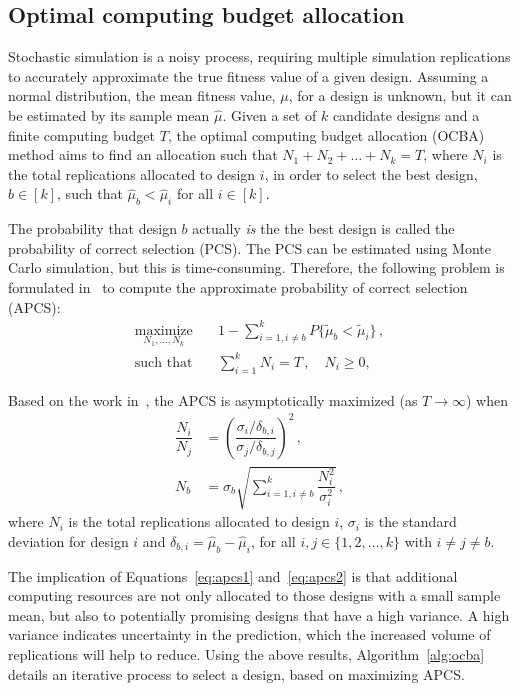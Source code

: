 \subsection{Optimal computing budget allocation}
Stochastic simulation is a noisy process, requiring multiple simulation replications to accurately approximate the true fitness value of a given design. Assuming a normal distribution, the mean fitness value, $\mu$, for a design is unknown, but it can be estimated by its sample mean $\hat{\mu}$. 
Given a set of $k$ candidate designs and a finite computing budget $T$, the optimal computing budget allocation (OCBA)~\cite{chen2011stochastic} method aims to find an allocation such that ${N_1 + N_2 + \ldots + N_k = T}$, where $N_i$ is the total replications allocated to design $i$, in order to select the best design, $b \in [k]$, such that $\hat{\mu}_b < \hat{\mu}_i$ for all $i \in [k]$.

The probability that design $b$ actually \emph{is} the the best design is called the probability of correct selection (PCS). The PCS can be estimated using Monte Carlo simulation, but this is time-consuming. Therefore, the following problem is formulated in~\cite{chen2011stochastic} to compute the approximate probability of correct selection (APCS):
\begin{align}
\underset{N_1,\dots,N_k}{\text{maximize}}&\quad 1 - \displaystyle\sum^k_{i=1,i\neq b}P\{\tilde\mu_b < \tilde\mu_i\}\,,\nonumber\\
\text{such that}& \quad \displaystyle\sum^k_{i=1}N_i = T\,, \quad N_i \geq 0,
\end{align}

Based on the work in~\cite{chen2011stochastic}, the APCS is asymptotically maximized (as $T \to \infty$) when
\begin{align}
\dfrac{N_i}{N_j} &= \left(\dfrac{\sigma_i/\delta_{b,i}}{\sigma_j/\delta_{b,j}}\right)^2\,,\label{eq:apcs1}\\[0.2cm]
N_b &= \sigma_b \sqrt{\displaystyle\sum^k_{i=1,i\neq b}\dfrac{N_i^2}{\sigma_i^2}}\,,\label{eq:apcs2}
\end{align}
where $N_i$ is the total replications allocated to design $i$, $\sigma_i$ is the standard deviation for design $i$ and $\delta_{b,i} = \hat{\mu}_b - \hat{\mu}_i$, for all $i,j\in \{1,2,\dots,k\}$ with $i \neq j \neq b$.

The implication of Equations~\ref{eq:apcs1} and~\ref{eq:apcs2} is that additional computing resources are not only allocated to those designs with a small sample mean, but also to potentially promising designs that have a high variance. A high variance indicates uncertainty in the prediction, which the increased volume of replications will help to reduce. Using the above results, Algorithm~\ref{alg:ocba} details an iterative process to select a design, based on maximizing APCS.

